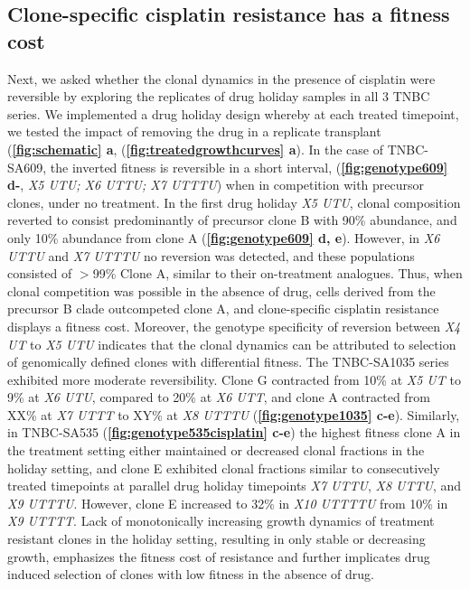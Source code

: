\subsection {Clone-specific cisplatin resistance has a fitness cost}
Next, we asked whether the clonal dynamics in the presence of cisplatin were reversible by exploring the replicates of drug holiday samples in
 all 3 TNBC series. We implemented a drug holiday design whereby at each treated timepoint, we tested the impact of removing the drug in a replicate transplant (\textbf{\autoref{fig:schematic} a}, (\textbf{\autoref{fig:treatedgrowthcurves} a}). In the case of TNBC-SA609, the inverted fitness is reversible in a short interval, (\textbf{\autoref{fig:genotype609} d-}, \textit{X5 UTU; X6 UTTU; X7 UTTTU}) when in competition with precursor clones, under no treatment. In the first drug holiday \textit{X5 UTU}, clonal composition reverted to consist predominantly of precursor clone B with 90\% abundance, and only 10\% abundance from clone A (\textbf{\autoref{fig:genotype609} d, e}). However, in \textit{X6  UTTU} and \textit{X7 UTTTU} no reversion was detected, and these populations consisted of $>$99\% Clone A, similar to their on-treatment analogues. Thus, when clonal competition was possible in the absence of drug, cells derived from the precursor B clade outcompeted clone A, and clone-specific cisplatin resistance displays a fitness cost. Moreover, the genotype specificity of reversion between \textit{X4 UT} to \textit{X5 UTU} indicates that the clonal dynamics can be attributed to selection of genomically defined clones with differential fitness. The TNBC-SA1035 series exhibited more moderate reversibility. Clone G contracted from 10\% at \textit{X5 UT} to 9\% at \textit{X6 UTU}, compared to 20\% at \textit{X6 UTT}, and clone A contracted from XX\% at \textit{X7 UTTT} to XY\% at \textit{X8 UTTTU} (\textbf{\autoref{fig:genotype1035} c-e}). 
Similarly, in TNBC-SA535 (\textbf{\autoref{fig:genotype535cisplatin} c-e}) the highest fitness clone A in the treatment setting either maintained or decreased clonal fractions in the holiday setting, and clone E exhibited clonal fractions similar to consecutively treated timepoints at parallel drug holiday timepoints \textit{X7 UTTU}, \textit{X8 UTTU}, and \textit{X9 UTTTU}.  However, clone E increased to 32\% in \textit{X10 UTTTTU} from 10\% in \textit{X9 UTTTT}.  Lack of monotonically increasing growth dynamics of treatment resistant clones in the holiday setting, resulting in only stable or decreasing growth, emphasizes the fitness cost of resistance and further implicates drug induced selection of clones with low fitness in the absence of drug.     



